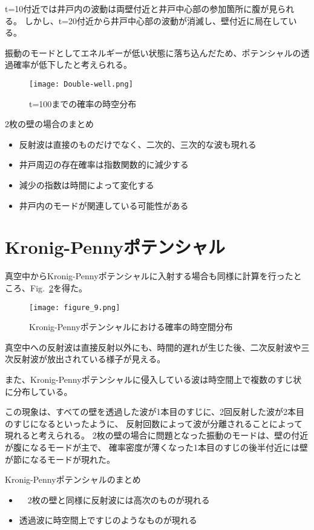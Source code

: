 \documentclass[autodetect-engine,dvipdfmx-if-dvi,ja=standard,a4paper,layout=v2]{bxjsreport}
\newcommand{\fref}[1]{Fig.~\ref{#1}}
\begin{document}
    t=10付近では井戸内の波動は両壁付近と井戸中心部の参加箇所に腹が見られる。
    しかし、t=20付近から井戸中心部の波動が消滅し、壁付近に局在している。\par
    振動のモードとしてエネルギーが低い状態に落ち込んだため、ポテンシャルの透過確率が低下したと考えられる。
    \begin{figure}
      \centering
      \texttt{[image: Double-well.png]}
      \caption{t=100までの確率の時空分布}
      \label{doubleWell}
    \end{figure}
    \begin{itembox}[l]{2枚の壁の場合のまとめ}
      \begin{itemize}
        \item 反射波は直接のものだけでなく、二次的、三次的な波も現れる
        \item 井戸周辺の存在確率は指数関数的に減少する
        \item 減少の指数は時間によって変化する
        \item 井戸内のモードが関連している可能性がある
      \end{itemize}
    \end{itembox}
    \section{Kronig-Pennyポテンシャル}
    真空中からKronig-Pennyポテンシャルに入射する場合も同様に計算を行ったところ、\fref{KPfig}を得た。
    \begin{figure}
      \centering
      \texttt{[image: figure\_9.png]}
      \caption{Kronig-Pennyポテンシャルにおける確率の時空間分布}
      \label{KPfig}
    \end{figure}
      真空中への反射波は直接反射以外にも、時間的遅れが生じた後、二次反射波や三次反射波が放出されている様子が見える。\par
      また、Kronig-Pennyポテンシャルに侵入している波は時空間上で複数のすじ状に分布している。\par
      この現象は、すべての壁を透過した波が1本目のすじに、2回反射した波が2本目のすじになるといったように、
      反射回数によって波が分離されることによって現れると考えられる。
      2枚の壁の場合に問題となった振動のモードは、壁の付近が腹になるモードが主で、
      確率密度が薄くなった1本目のすじの後半付近には壁が節になるモードが現れた。\par
      \begin{itembox}[l]{Kronig-Pennyポテンシャルのまとめ}
        \begin{itemize}
          \item　2枚の壁と同様に反射波には高次のものが現れる
          \item 透過波に時空間上ですじのようなものが現れる
        \end{itemize}
      \end{itembox}
\end{document}
